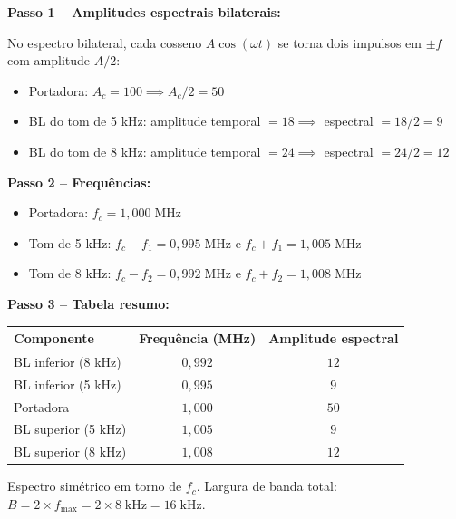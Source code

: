 \documentclass[11pt,a4paper]{article}
\begin{document}
\begin{resolucao}

\textbf{Passo 1 -- Amplitudes espectrais bilaterais:}

No espectro bilateral, cada cosseno $A\cos(\omega t)$ se torna dois impulsos em $\pm f$ com amplitude $A/2$:
\begin{itemize}
  \item Portadora: $A_c = 100 \implies A_c/2 = 50$
  \item BL do tom de 5 kHz: amplitude temporal $= 18 \implies$ espectral $= 18/2 = 9$
  \item BL do tom de 8 kHz: amplitude temporal $= 24 \implies$ espectral $= 24/2 = 12$
\end{itemize}

\textbf{Passo 2 -- Frequências:}
\begin{itemize}
  \item Portadora: $f_c = 1{,}000\;\text{MHz}$
  \item Tom de 5 kHz: $f_c - f_1 = 0{,}995\;\text{MHz}$ e $f_c + f_1 = 1{,}005\;\text{MHz}$
  \item Tom de 8 kHz: $f_c - f_2 = 0{,}992\;\text{MHz}$ e $f_c + f_2 = 1{,}008\;\text{MHz}$
\end{itemize}

\textbf{Passo 3 -- Tabela resumo:}

\begin{center}
\small
\begin{tabular}{lcc}
  \toprule
  Componente & Frequência (MHz) & Amplitude espectral \\
  \midrule
  BL inferior (8 kHz) & $0{,}992$ & $12$ \\
  BL inferior (5 kHz) & $0{,}995$ & $9$ \\
  Portadora & $1{,}000$ & $50$ \\
  BL superior (5 kHz) & $1{,}005$ & $9$ \\
  BL superior (8 kHz) & $1{,}008$ & $12$ \\
  \bottomrule
\end{tabular}
\end{center}

Espectro simétrico em torno de $f_c$. Largura de banda total: $B = 2 \times f_{\max} = 2 \times 8\;\text{kHz} = 16\;\text{kHz}$.
\end{resolucao}


\end{document}
